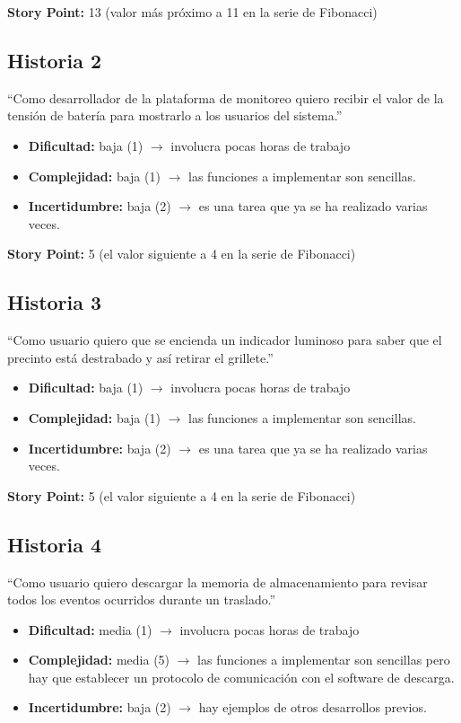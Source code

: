 \documentclass[
11pt, %
]{charter}
\begin{document}
\textbf{Story Point:} 13 (valor más próximo a 11 en la serie de Fibonacci) 

\subsection{Historia 2}
``Como desarrollador de la plataforma de monitoreo quiero recibir el valor de la tensión de batería para mostrarlo a los usuarios del sistema.''

\begin{itemize}
	\item \textbf{Dificultad:} baja (1) $\rightarrow$ involucra pocas horas de trabajo
	\item \textbf{Complejidad:} baja (1) $\rightarrow$ las funciones a implementar son sencillas.
	\item \textbf{Incertidumbre:} baja (2) $\rightarrow$ es una tarea que ya se ha realizado varias veces.
\end{itemize}

\textbf{Story Point:} 5 (el valor siguiente a 4 en la serie de Fibonacci) 

\subsection{Historia 3}
``Como usuario quiero que se encienda un indicador luminoso para saber que el precinto está destrabado y así retirar el grillete.''

\begin{itemize}
	\item \textbf{Dificultad:} baja (1) $\rightarrow$ involucra pocas horas de trabajo
	\item \textbf{Complejidad:} baja (1) $\rightarrow$ las funciones a implementar son sencillas.
	\item \textbf{Incertidumbre:} baja (2) $\rightarrow$ es una tarea que ya se ha realizado varias veces.
\end{itemize}

\textbf{Story Point:} 5 (el valor siguiente a 4 en la serie de Fibonacci) 

\subsection{Historia 4}
``Como usuario quiero descargar la memoria de almacenamiento para revisar todos los eventos ocurridos durante un traslado.''

\begin{itemize}
	\item \textbf{Dificultad:} media (1) $\rightarrow$ involucra pocas horas de trabajo
	\item \textbf{Complejidad:} media (5) $\rightarrow$ las funciones a implementar son sencillas pero hay que establecer un protocolo de comunicación con el software de descarga.
	\item \textbf{Incertidumbre:} baja (2) $\rightarrow$ hay ejemplos de otros desarrollos previos.
\end{itemize}
\end{document}
